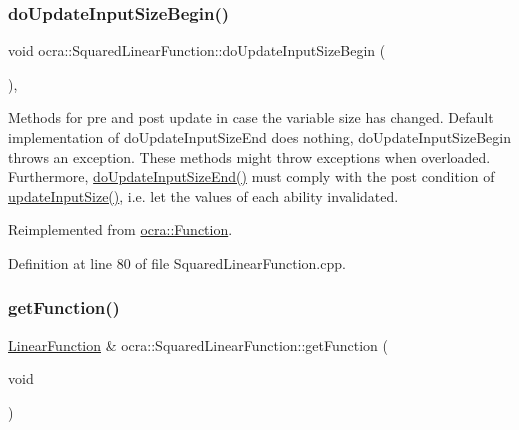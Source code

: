 \subsubsection{\texorpdfstring{do\+Update\+Input\+Size\+Begin()}{doUpdateInputSizeBegin()}}
{\footnotesize\ttfamily void ocra\+::\+Squared\+Linear\+Function\+::do\+Update\+Input\+Size\+Begin (\begin{DoxyParamCaption}{ }\end{DoxyParamCaption})\hspace{0.3cm}{\ttfamily [protected]}, {\ttfamily [virtual]}}

Methods for pre and post update in case the variable size has changed. Default implementation of do\+Update\+Input\+Size\+End does nothing, do\+Update\+Input\+Size\+Begin throws an exception. These methods might throw exceptions when overloaded. Furthermore, {\ttfamily \hyperlink{classocra_1_1QuadraticFunction_ab3d5478fd8ded343453e0489c595e580}{do\+Update\+Input\+Size\+End()}} must comply with the post condition of {\ttfamily \hyperlink{classocra_1_1Function_a3a5b9e6ae296339acc87ab2cbf97ef98}{update\+Input\+Size()}}, i.\+e. let the values of each ability invalidated. 

Reimplemented from \hyperlink{classocra_1_1Function_a3f728f3758e6448aa59932853db5ddcc}{ocra\+::\+Function}.



Definition at line 80 of file Squared\+Linear\+Function.\+cpp.

\hypertarget{classocra_1_1SquaredLinearFunction_aff22d70c8edf05b5b488ffe6ce426e87}{}\label{classocra_1_1SquaredLinearFunction_aff22d70c8edf05b5b488ffe6ce426e87} 
\subsubsection{\texorpdfstring{get\+Function()}{getFunction()}\hspace{0.1cm}{\footnotesize\ttfamily [1/2]}}
{\footnotesize\ttfamily \hyperlink{classocra_1_1LinearFunction}{Linear\+Function} \& ocra\+::\+Squared\+Linear\+Function\+::get\+Function (\begin{DoxyParamCaption}\item[{void}]{ }\end{DoxyParamCaption})}




